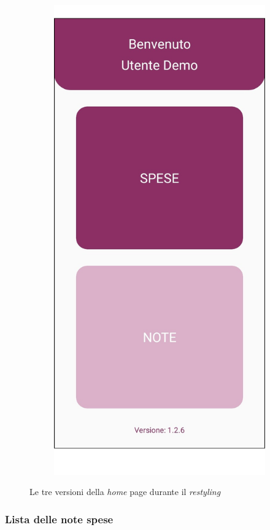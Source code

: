 \begin{figure}[H]
\begin{subfigure}{.5\textwidth}
        \includegraphics[width=.7\columnwidth]{images/screenshot/new/home.png}\vspace{2mm}
    \end{subfigure}
    \caption{Le tre versioni della \textit{home} page durante il \textit{restyling}}
\end{figure}


\subsubsection{Lista delle note spese}

